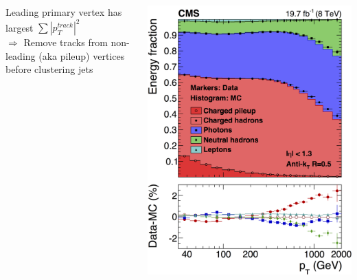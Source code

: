 \begin{frame}[t]
\begin{columns}[T]
\begin{column}{0.58\textwidth}
    		Leading primary vertex has largest $\sum |p_{T}^{track}|^{2}$\\
    		\vspace*{0.2cm}
    		$\Rightarrow$ Remove tracks from non-leading (aka pileup) vertices before clustering jets
    	\end{column}
    	\begin{column}{0.38\textwidth}
    		\includegraphics[width=\textwidth]{images/pileup_mitigation/composition_combo_pt_pfpaper_final_v2.png}
    	\end{column}
    \end{columns}
\end{frame}


